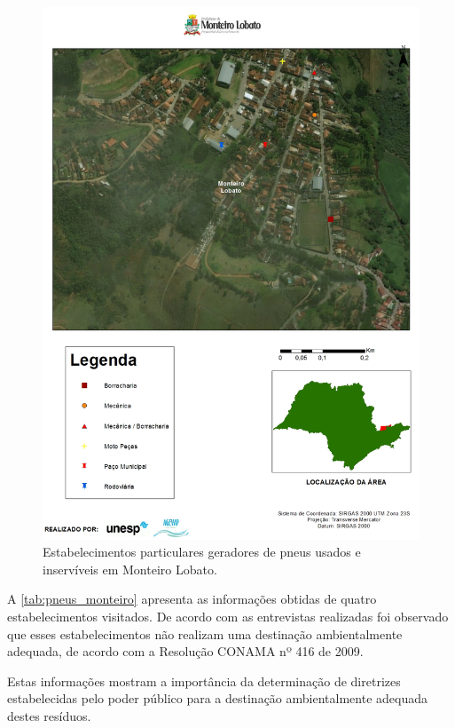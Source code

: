 \begin{description}
	\begin{figure}
		\centering
		\includegraphics[width=1\linewidth]{produtos/prodtres/image092}
		\caption{Estabelecimentos particulares geradores de pneus usados e inservíveis em Monteiro Lobato.}
		\label{fig:image092}
	\end{figure}
	
	A \autoref{tab:pneus_monteiro} apresenta as informações obtidas de quatro estabelecimentos visitados. De acordo com as entrevistas realizadas foi observado que esses estabelecimentos não realizam uma destinação ambientalmente adequada, de acordo com a Resolução CONAMA nº 416 de 2009.
	
	
	
	Estas informações mostram a importância da determinação de diretrizes estabelecidas pelo poder público para a destinação ambientalmente adequada destes resíduos.
	

\end{description}

